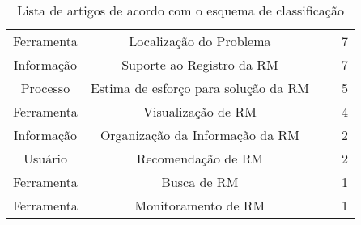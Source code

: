 \begin{table}[htbp]
{\begin{tabular}{|c|c|l|c|}
\multirow{3}{*}{Ferramenta}   & \multirow{3}{*}{Localização do Problema}      & \cite{Bangcharoensap:2012:LSC:2419061.2419428,corley2011recovering,Nguyen:2012:MAR:2393596.2393671}      & \multirow{3}{*}{7}  \\
                              &                                               & \cite{Thung:2014:BIT:2635868.2661678,Wong:2014:BBF:2705615.2706096}                                      &                     \\
                              &                                               & \cite{Romo:2015:TAT:2745802.2745833,thung2013automatic}                                                  &                     \\ \hline
\multirow{2}{*}{Informação}   & \multirow{2}{*}{Suporte ao Registro da RM}    &
\cite{bettenburg2008makes,Correa2013b,moran2015auto,Moran:2015:EAA:2786805.2807557}                          & \multirow{2}{*}{7}  \\
                              &                                               & \cite{Tu:2014:MQI:2677832.2677844,White:2015:GRR:2820282.2820291,Wu2011a}                                &                     \\ \hline
\multirow{2}{*}{Processo}     & \multirow{2}{*}{Estima de esforço para solução
    da RM}      & \cite{Bhattacharya:2011:BTP:1985441.1985472,Nagwani2010,thung2012would}                                  & \multirow{2}{*}{5}  \\
                              &                                               & \cite{Vijayakumar2014,xia2015automatic}                                                                  &                     \\ \hline
Ferramenta                    & Visualização de RM                            & \cite{dal2013closer,dal2014bug,hora2012bug,takama2013application}                                        & 4                   \\ \hline
Informação                    & Organização da Informação da RM               & \cite{mani2012ausum,otoom2016severity}                                                                   & 2                   \\ \hline
Usuário                       & Recomendação de RM                            & \cite{malheiros2012source,Wang2011bug}                                                                   & 2                   \\ \hline
Ferramenta                   & Busca de RM                                   & \cite{liu2014faceted}                                                                                    & 1                   \\ \hline
Ferramenta                    & Monitoramento de RM                           &~\cite{Aggarwal:2014:MIT:2593801.2593810}                                                                 & 1                   \\ \hline
\end{tabular}%
}
\caption{Lista de artigos de acordo com o esquema de classificação}
\label{tab:taxonomia-problemas-manutencao}
\end{table}
